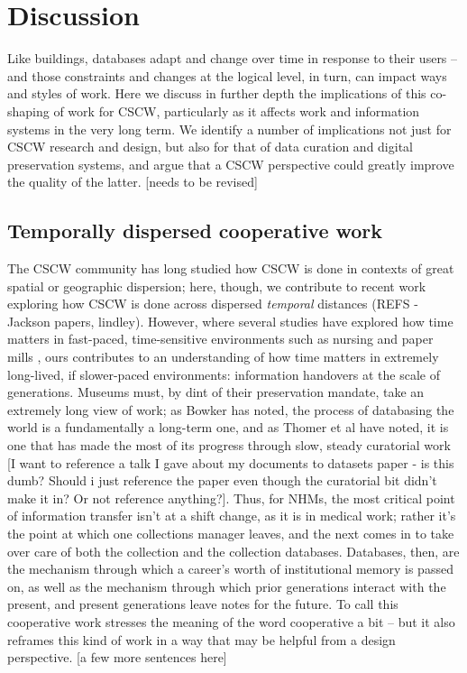 \section{Discussion}

Like buildings, databases adapt and change over time in response to their users -- and those constraints and changes at the logical level, in turn, can impact ways and styles of work.  Here we discuss in further depth the implications of this co-shaping of work for CSCW, particularly as it affects work and information systems in the very long term. We identify a number of implications not just for CSCW research and design, but also for that of data curation and digital preservation systems, and argue that a CSCW perspective could greatly improve the quality of the latter. [needs to be revised]

\subsection{Temporally dispersed cooperative work}

The CSCW community has long studied how CSCW is done in contexts of great spatial or geographic dispersion; here, though, we contribute to recent work exploring how CSCW is done across dispersed \textit{temporal} distances (REFS - Jackson papers, lindley). However, where several studies have explored how time matters in fast-paced, time-sensitive environments such as nursing \cite{sarcevic2009information, Reddy_2006}  and paper mills \cite{auramaki1996paperwork}, ours contributes to an understanding of how time matters in extremely long-lived, if slower-paced environments: information handovers at the scale of generations. Museums must, by dint of their preservation mandate, take an extremely long view of work; as Bowker has noted, the process of databasing the world is a fundamentally a long-term one, and as Thomer et al have noted, it is one that has made the most of its progress through slow, steady curatorial work [I want to reference a talk I gave about my documents to datasets paper - is this dumb? Should i just reference the paper even though the curatorial bit didn't make it in? Or not reference anything?]. Thus, for NHMs, the most critical point of information transfer isn't at a shift change, as it is in medical work; rather it's the point at which one collections manager leaves, and the next comes in to take over care of both the collection and the collection databases. Databases, then, are the mechanism through which a career's worth of institutional memory is passed on, as well as the mechanism through which prior generations interact with the present, and present generations leave notes for the future. To call this cooperative work stresses the meaning of the word cooperative a bit -- but it also reframes this kind of work in a way that may be helpful from a design perspective. [a few more sentences here]

